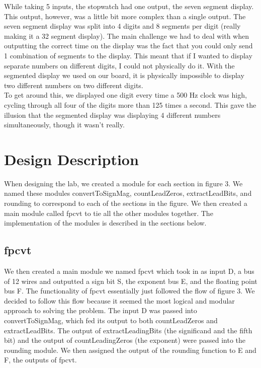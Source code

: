 \documentclass{article}
\begin{document}
While taking 5 inputs, the stopwatch had one output, the seven segment display.  This output, however, was a little bit more complex than a single output.  The seven segment display was split into 4 digits and 8 segments per digit (really making it a 32 segment display).  The main challenge we had to deal with when outputting the correct time on the display was the fact that you could only send 1 combination of segments to the display. This meant that if I wanted to display separate numbers on different digits, I could not physically do it.  With the segmented display we used on our board, it is physically impossible to display two different numbers on two different digits.\\ 
To get around this, we displayed one digit every time a 500 Hz clock was high, cycling through all four of the digits more than 125 times a second.  This gave the illusion that the segmented display was displaying 4 different numbers simultaneously, though it wasn't really.

 

\section*{Design Description}



When designing the lab, we created a module for each section in figure 3. We named these modules convertToSignMag, countLeadZeros, extractLeadBits, and rounding to correspond to each of the sections in the figure. We then created a main module called fpcvt to tie all the other modules together. The implementation of the modules is described in the sections below.

\subsection*{fpcvt}
We then created a main module we named fpcvt which took in as input D, a bus of 12 wires and outputted a sign bit S, the exponent bus E, and the floating point bus F. The functionality of fpcvt essentially just followed the flow of figure 3. We decided to follow this flow because it seemed the most logical and modular approach to solving the problem. The input D was passed into convertToSignMag, which fed its output to both countLeadZeros and extractLeadBits. The output of extractLeadingBits (the significand and the fifth bit) and the output of countLeadingZeros (the exponent) were passed into the rounding module. We then assigned the output of the rounding function to E and F, the outputs of fpcvt.
\end{document}

